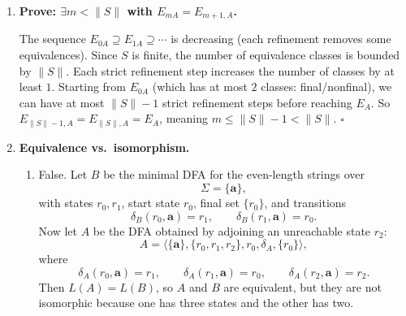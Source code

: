 \begin{enumerate}[{3.}1.]
\begin{enumerate}
\item Yes. Define
\[
\psi([x]_{R_{L(M)}})= [\DBAR_M(s_0,x)]_{E_M}.
\]
This is well defined: if $xR_{L(M)}y$, then for every $z\in\Sigma^*$,
\[
xz\in L(M)\Leftrightarrow yz\in L(M),
\]
so the states $\DBAR_M(s_0,x)$ and $\DBAR_M(s_0,y)$ have the same future
language and are therefore $E_M$-equivalent.

Now
\[
\psi([\lambda]_{R_{L(M)}})=[s_0]_{E_M},
\]
and for any $a\in\Sigma$,
\[
\psi(\delta_{R_{L(M)}}([x]_{R_{L(M)}},a))
=\psi([xa]_{R_{L(M)}})
=[\DBAR_M(s_0,xa)]_{E_M}
=[\delta(\DBAR_M(s_0,x),a)]_{E_M}
=\delta_{E_M}(\psi([x]_{R_{L(M)}}),a).
\]
Finally,
\[
[x]_{R_{L(M)}}\in F_{R_{L(M)}}
\Leftrightarrow x\in L(M)
\Leftrightarrow \DBAR_M(s_0,x)\in F
\Leftrightarrow [\DBAR_M(s_0,x)]_{E_M}\in F_{E_M}.
\]
So $\psi$ is a homomorphism from $A_{R_{L(M)}}$ to $M/_{E_M}$. $\square$
\end{enumerate}

\item \textbf{Prove: $\exists m<\|S\|$ with $E_{mA}=E_{m+1,A}$.}

The sequence $E_{0A}\supseteq E_{1A}\supseteq\cdots$ is decreasing (each refinement removes some equivalences). Since $S$ is finite, the number of equivalence classes is bounded by $\|S\|$. Each strict refinement step increases the number of classes by at least $1$. Starting from $E_{0A}$ (which has at most $2$ classes: final/nonfinal), we can have at most $\|S\|-1$ strict refinement steps before reaching $E_A$. So $E_{\|S\|-1,A}=E_{\|S\|,A}=E_A$, meaning $m\leq\|S\|-1<\|S\|$. $\square$

\item \textbf{Equivalence vs.\ isomorphism.}

\begin{enumerate}
\item False. Let $B$ be the minimal DFA for the even-length strings over
\[
\Sigma=\{\pmb{a}\},
\]
with states $r_0,r_1$, start state $r_0$, final set $\{r_0\}$, and transitions
\[
\delta_B(r_0,\pmb{a})=r_1,\qquad \delta_B(r_1,\pmb{a})=r_0.
\]
Now let $A$ be the DFA obtained by adjoining an unreachable state $r_2$:
\[
A=\langle\{\pmb{a}\},\{r_0,r_1,r_2\},r_0,\delta_A,\{r_0\}\rangle,
\]
where
\[
\delta_A(r_0,\pmb{a})=r_1,\qquad \delta_A(r_1,\pmb{a})=r_0,\qquad
\delta_A(r_2,\pmb{a})=r_2.
\]
Then $L(A)=L(B)$, so $A$ and $B$ are equivalent, but they are not isomorphic
because one has three states and the other has two.


\end{enumerate}
\end{enumerate}
